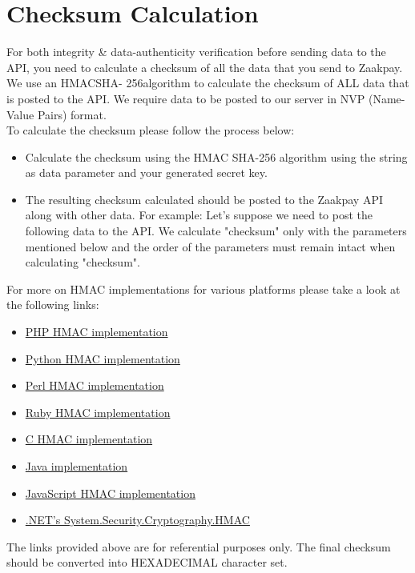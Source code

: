 \documentclass{article}
\begin{document}
\section {Checksum Calculation}
For both integrity \& data-authenticity verification before sending data to the API, you need to calculate a checksum of all the data that you send to Zaakpay. We use an HMACSHA- 256algorithm to calculate the checksum of ALL data that is posted to the API. We require data to be posted to our server in NVP (Name-Value Pairs) format.
\\ To calculate the checksum please follow the process below:
\begin{itemize}
\item Calculate the checksum using the HMAC SHA-256 algorithm using the string as data parameter and your generated secret key.
\item The resulting checksum calculated should be posted to the Zaakpay API along with other data. For example: Let's suppose we need to post the following data to the API. We calculate "checksum" only with the parameters mentioned below and the order of the parameters must remain intact when calculating "checksum".
\end{itemize}

For more on HMAC implementations for various platforms please take a look at the following links:
 \begin{itemize}
\item \href{http://www.jokecamp.com/blog/examples-of-creating-base64-hashes-using-hmac-sha256-in-different-languages/#php}{PHP HMAC implementation}
\item \href{http://www.jokecamp.com/blog/examples-of-creating-base64-hashes-using-hmac-sha256-in-different-languages/#python}{Python HMAC implementation}
\item \href{http://www.jokecamp.com/blog/examples-of-creating-base64-hashes-using-hmac-sha256-in-different-languages/#perl}{Perl HMAC implementation}
\item \href{http://www.jokecamp.com/blog/examples-of-creating-base64-hashes-using-hmac-sha256-in-different-languages/#ruby3}{Ruby HMAC implementation}
\item \href{https://gist.github.com/tsupo/112188/acdbf002acf454bd60c355a776b9a5b58b6dff5e}{C HMAC implementation}
\item \href{http://www.jokecamp.com/blog/examples-of-creating-base64-hashes-using-hmac-sha256-in-different-languages/#java}{Java implementation}
\item \href{http://www.jokecamp.com/blog/examples-of-creating-base64-hashes-using-hmac-sha256-in-different-languages/#js}{JavaScript HMAC implementation}
\item \href{http://www.jokecamp.com/blog/examples-of-creating-base64-hashes-using-hmac-sha256-in-different-languages/#csharp}{.NET's System.Security.Cryptography.HMAC}
 \end{itemize}
The links provided above are for referential purposes only. The final checksum should be
converted into HEXADECIMAL character set.
\newpage
\end{document}

